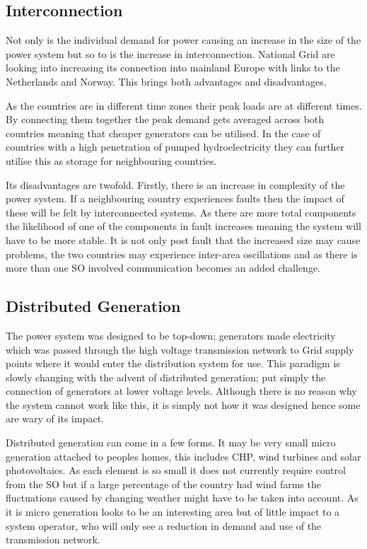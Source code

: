 \documentclass[a4paper,oneside,12pt]{report}
\begin{document}
\subsection{Interconnection}

Not only is the individual demand for power causing an increase in the size of the power system but so to is the increase in interconnection. National Grid are looking into increasing its connection into mainland Europe with links to the Netherlands and Norway. This brings both advantages and disadvantages.

As the countries are in different time zones their peak loads are at different times. By connecting them together the peak demand gets averaged across both countries meaning that cheaper generators can be utilised. In the case of countries with a high penetration of pumped hydroelectricity they can further utilise this as storage for neighbouring countries.

Its disadvantages are twofold. Firstly, there is an increase in complexity of the power system. If a neighbouring country experiences faults then the impact of these will be felt by interconnected systems. As there are more total components the likelihood of one of the components in fault increases meaning the system will have to be more stable. It is not only post fault that the increased size may cause problems, the two countries may experience inter-area oscillations and as there is more than one SO involved communication becomes an added challenge.

\subsection{Distributed Generation}

The power system was designed to be top-down; generators made electricity which was passed through the high voltage transmission network to Grid supply points where it would enter the distribution system for use. This paradigm is slowly changing with the advent of distributed generation; put simply the connection of generators at lower voltage levels. Although there is no reason why the system cannot work like this, it is simply not how it was designed hence some are wary of its impact.

Distributed generation can come in a few forms. It may be very small micro generation attached to peoples homes, this includes CHP, wind turbines and solar photovoltaics. As each element is so small it does not currently require control from the SO but if a large percentage of the country had wind farms the fluctuations caused by changing weather might have to be taken into account. As it is micro generation looks to be an interesting area but of little impact to a system operator, who will only see a reduction in demand and use of the transmission network.
\end{document}
